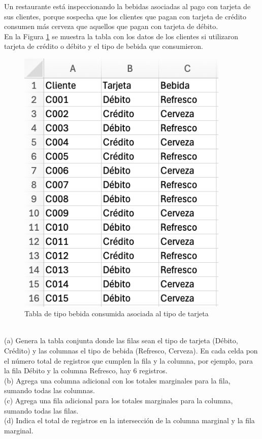 \documentclass{article}
\begin{document}
Un restaurante está inspeccionando la bebidas asociadas al pago con tarjeta de sus clientes, porque sospecha que los clientes que pagan con tarjeta de crédito consumen más cerveza que aquellos que pagan con tarjeta de débito.
\\[12pt]
En la Figura \ref{fig:p202} se muestra la tabla con los datos de los clientes si utilizaron tarjeta de crédito o débito y el tipo de bebida que consumieron.
\begin{figure}[!ht]
    \centering
    \begin{minipage}{\textwidth}
        \centering
        \includegraphics[width=0.9\textwidth]{figures/p202.png}
    \end{minipage}
    \captionsetup{width=0.9\textwidth}
    \caption{Tabla de tipo bebida consumida asociada al tipo de tarjeta}
    \label{fig:p202}
\end{figure}
\\

\break
\noindent
(a) Genera la tabla conjunta donde las filas sean el tipo de tarjeta (Débito, Crédito) y las columnas el tipo de bebida (Refresco, Cerveza). En cada celda pon el número total de registros que cumplen la fila y la columna, por ejemplo, para la fila Débito y la columna Refresco, hay 6 registros.
\\[6pt]
(b) Agrega una columna adicional con los totales marginales para la fila, sumando todas las columnas.
\\[6pt]
(c) Agrega una fila adicional para los totales marginales para la columna, sumando todas las filas.
\\[6pt]
(d) Indica el total de registros en la intersección de la columna marginal y la fila marginal.
\end{document}
